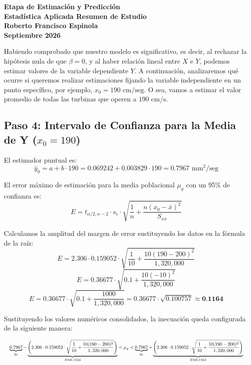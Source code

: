 \documentclass[11pt,a4paper]{article}
\begin{document}
\begin{center}
    \Large \textbf{Etapa de Estimación y Predicción} \\[0.5cm]
    \normalsize \textbf{Estadística Aplicada Resumen de Estudio} \\
    \textbf{Roberto Francisco Espinola} \\
    \textbf{Septiembre 2026}
\end{center}

\vspace{0.5cm}

Habiendo comprobado que nuestro modelo es significativo, es decir, al rechazar la hipótesis nula de que $\beta = 0$, y al haber relación lineal entre $X$ e $Y$, podemos estimar valores de la variable dependiente $Y$. A continuación, analizaremos qué ocurre si queremos realizar estimaciones fijando la variable independiente en un punto específico, por ejemplo, $x_0 = 190 \text{ cm/seg}$. O sea, vamos a estimar el valor promedio de todas las turbinas que operen a $190 \text{ cm/s}$.

\vspace{0.4cm}

\subsection*{Paso 4: Intervalo de Confianza para la Media de Y ($x_0 = 190$)}

El estimador puntual es:
\[
\hat{y}_0 = a + b \cdot 190 = 0.069242 + 0.003829 \cdot 190 = \mathbf{0.7967} \text{ mm}^2\text{/seg}
\]

El error máximo de estimación para la media poblacional $\mu_y$ con un 95\% de confianza es:
\[
E = t_{\alpha/2, n-2} \cdot s_e \cdot \sqrt{\frac{1}{n} + \frac{n(x_0 - \bar{x})^2}{S_{xx}}}
\]

Calculamos la amplitud del margen de error sustituyendo los datos en la fórmula de la raíz:
\[
E = 2.306 \cdot 0.159052 \cdot \sqrt{\frac{1}{10} + \frac{10(190 - 200)^2}{1,320,000}}
\]
\[
E = 0.36677 \cdot \sqrt{0.1 + \frac{10(-10)^2}{1,320,000}}
\]
\[
E = 0.36677 \cdot \sqrt{0.1 + \frac{1000}{1,320,000}} = 0.36677 \cdot \sqrt{0.100757} \approx \textbf{0.1164}
\]

\vspace{0.3cm}
Sustituyendo los valores numéricos consolidados, la inecuación queda configurada de la siguiente manera:

\[
\resizebox{\textwidth}{!}{$\displaystyle
\underbrace{0.7967}_{\hat{y}_0} - \underbrace{\left( 2.306 \cdot 0.159052 \cdot \sqrt{\frac{1}{10} + \frac{10(190 - 200)^2}{1,320,000}} \right)}_{E \approx 0.1164} < \mu_y < \underbrace{0.7967}_{\hat{y}_0} + \underbrace{\left( 2.306 \cdot 0.159052 \cdot \sqrt{\frac{1}{10} + \frac{10(190 - 200)^2}{1,320,000}} \right)}_{E \approx 0.1164}
$}
\]
\end{document}
